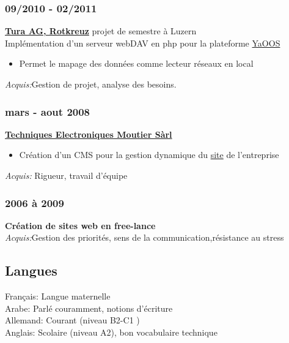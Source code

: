 \documentclass[12pt,a4paper,twoside]{report}
\begin{document}
 \subsubsection{09/2010 - 02/2011}
 \vspace{-0.4cm}
\textbf{\href{http://www.tura.ch/}{Tura AG, Rotkreuz} }projet de semestre à Luzern\\
Implémentation d'un serveur webDAV en php pour la plateforme  \href{http://www.yaoos.org/}{YaOOS} 
\begin{itemize}
\item Permet le mapage des données comme lecteur réseaux en local
\end{itemize}
\textit{Acquis:}Gestion de projet, analyse des besoins. 
\vspace{-0.2cm}
 \subsubsection{mars - aout 2008}
 \vspace{-0.4cm}
\textbf{\href{http://www.tem-sarl.ch/fr}{Techniques Electroniques Moutier Sàrl}}
\begin{itemize}
\item Création d'un CMS pour la gestion dynamique du  \href{http://www.tem-sarl.ch/fr}{site} de l'entreprise
\end{itemize}
\textit{Acquis:} Rigueur, travail d'équipe 
\vspace{-0.2cm}
 \subsubsection{2006 à 2009}
 \vspace{-0.4cm}
\textbf{Création de sites web en free-lance}\\
\textit{Acquis:}Gestion des priorités, sens de la communication,résistance au stress 

\subsection{Langues }
\vspace{-0.4cm}
Français: Langue maternelle\\
Arabe: Parlé couramment, notions d'écriture  \\
Allemand: Courant (niveau B2-C1 )\\
Anglais: Scolaire (niveau A2), bon vocabulaire technique

\cleardoublepage

\end{document}
